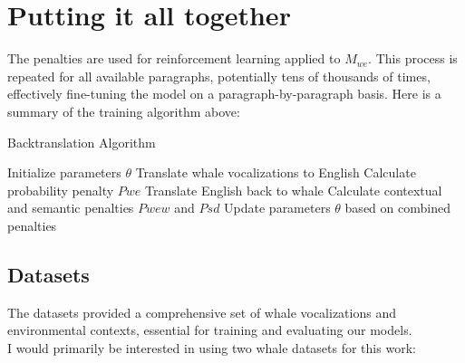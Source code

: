 \documentclass{article}
\begin{document}
\section{Putting it all together}
The penalties are used for reinforcement learning applied to $M_{we}$. This process is repeated for all available paragraphs, potentially tens of thousands of times, effectively fine-tuning the model on a paragraph-by-paragraph basis.
Here is a summary of the training algorithm above:
\begin{algorithm}
\caption{Backtranslation Algorithm}
\begin{algorithmic}[1]
\STATE Initialize parameters $\theta$
\STATE Translate whale vocalizations to English
\STATE Calculate probability penalty $Pwe$
\STATE Translate English back to whale
\STATE Calculate contextual and semantic penalties $Pwew$ and $Psd$
\STATE Update parameters $\theta$ based on combined penalties
\ENDFOR
\end{algorithmic}
\end{algorithm}
\subsection{Datasets}
The datasets provided a comprehensive set of whale vocalizations and environmental contexts, essential for training and evaluating our models.\\

I would primarily be interested in using two whale datasets for this work: 
\end{document}
